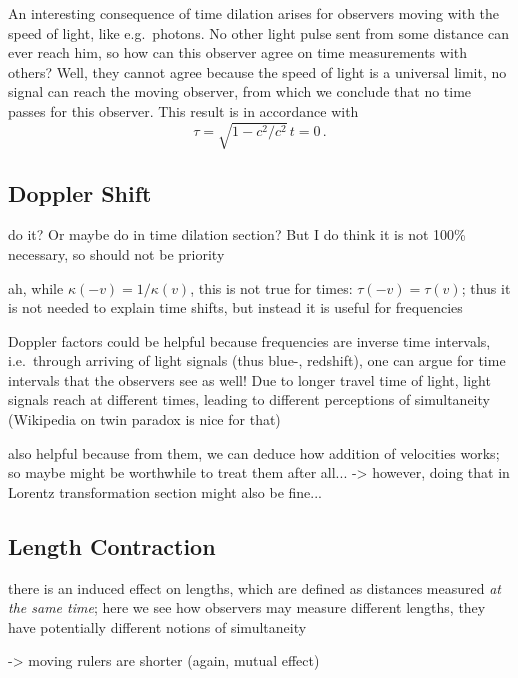 An interesting consequence of time dilation arises for observers moving with the speed of light, like e.g.~photons. No other light pulse sent from some distance can ever reach him, so how can this observer agree on time measurements with others? Well, they cannot agree because the speed of light is a universal limit, no signal can reach the moving observer, from which we conclude that no time passes for this observer. This result is in accordance with
\begin{equation}
\tau = \sqrt{1 - c^2 / c^2} \, t = 0 \, .
\end{equation}



		\subsection{Doppler Shift}
do it? Or maybe do in time dilation section? But I do think it is not 100\% necessary, so should not be priority


ah, while $\kappa(-v) = 1 / \kappa(v)$, this is not true for times: $\tau(-v) = \tau(v)$; thus it is not needed to explain time shifts, but instead it is useful for frequencies


Doppler factors could be helpful because frequencies are inverse time intervals, i.e.~through arriving of light signals (thus blue-, redshift), one can argue for time intervals that the observers see as well! Due to longer travel time of light, light signals reach at different times, leading to different perceptions of simultaneity (Wikipedia on twin paradox is nice for that)


also helpful because from them, we can deduce how addition of velocities works; so maybe might be worthwhile to treat them after all... -> however, doing that in Lorentz transformation section might also be fine...



		\subsection{Length Contraction}
there is an induced effect on lengths, which are defined as distances measured \emph{at the same time}; here we see how observers may measure different lengths, they have potentially different notions of simultaneity

-> moving rulers are shorter (again, mutual effect)





